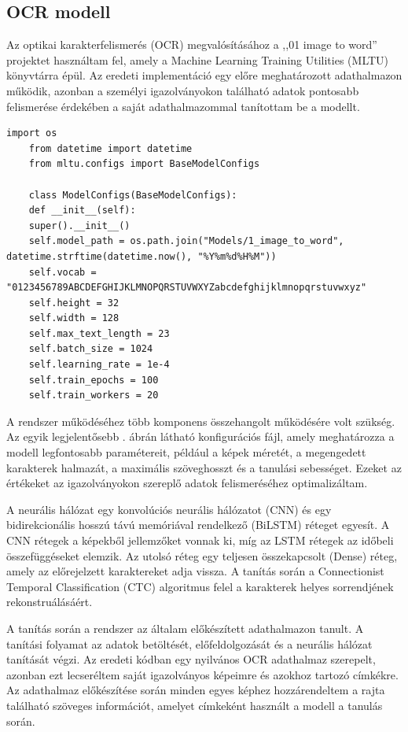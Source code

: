\documentclass[
]{thesis-ekf}
\theoremstyle{definition}
\theoremstyle{remark}
\begin{document}
\subsection{OCR modell}

Az optikai karakterfelismerés (OCR) megvalósításához a ,,01 image to word'' projektet használtam fel, amely a Machine Learning Training Utilities (MLTU) könyvtárra épül. Az eredeti implementáció egy előre meghatározott adathalmazon működik, azonban a személyi igazolványokon található adatok pontosabb felismerése érdekében a saját adathalmazommal tanítottam be a modellt.

\begin{lstlisting}[style=mypython,caption=Konfigurációs fájl, label=kod-python3]
	import os
	from datetime import datetime
	from mltu.configs import BaseModelConfigs
	
	class ModelConfigs(BaseModelConfigs):
	def __init__(self):
	super().__init__()
	self.model_path = os.path.join("Models/1_image_to_word", datetime.strftime(datetime.now(), "%Y%m%d%H%M"))
	self.vocab = "0123456789ABCDEFGHIJKLMNOPQRSTUVWXYZabcdefghijklmnopqrstuvwxyz"
	self.height = 32
	self.width = 128
	self.max_text_length = 23
	self.batch_size = 1024
	self.learning_rate = 1e-4
	self.train_epochs = 100
	self.train_workers = 20
\end{lstlisting}

A rendszer működéséhez több komponens összehangolt működésére volt szükség. Az egyik legjelentősebb . ábrán látható konfigurációs fájl, amely meghatározza a modell legfontosabb paramétereit, például a képek méretét, a megengedett karakterek halmazát, a maximális szöveghosszt és a tanulási sebességet. Ezeket az értékeket az igazolványokon szereplő adatok felismeréséhez optimalizáltam.

A neurális hálózat  egy konvolúciós neurális hálózatot (CNN) és egy bidirekcionális hosszú távú memóriával rendelkező (BiLSTM) réteget egyesít. A CNN rétegek a képekből jellemzőket vonnak ki, míg az LSTM rétegek az időbeli összefüggéseket elemzik. Az utolsó réteg egy teljesen összekapcsolt (Dense) réteg, amely az előrejelzett karaktereket adja vissza. A tanítás során a Connectionist Temporal Classification (CTC) algoritmus felel a karakterek helyes sorrendjének rekonstruálásáért.

A tanítás során a rendszer az általam előkészített adathalmazon tanult. A tanítási folyamat az adatok betöltését, előfeldolgozását és a neurális hálózat tanítását végzi. Az eredeti kódban egy nyilvános OCR adathalmaz szerepelt, azonban ezt lecseréltem saját igazolványos képeimre és azokhoz tartozó címkékre. Az adathalmaz előkészítése során minden egyes képhez hozzárendeltem a rajta található szöveges információt, amelyet címkeként használt a modell a tanulás során.
\end{document}
